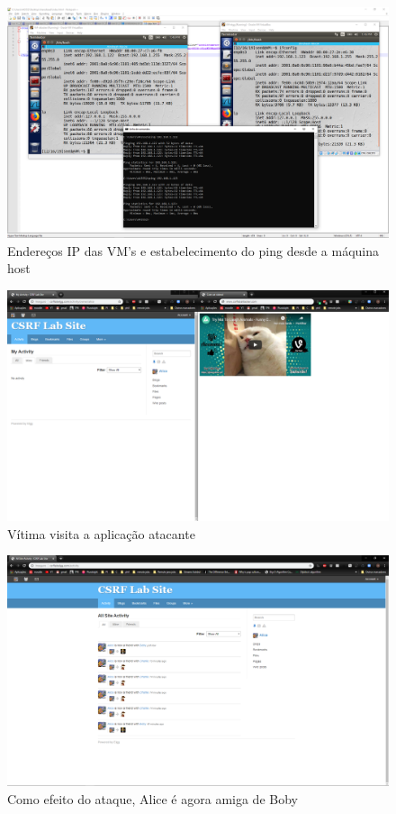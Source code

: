 \documentclass[11pt]{report}
\begin{document}
	
\begin{figure}[!htb]
	\includegraphics[width=\linewidth]{img/ping}
	\caption{Endereços IP das VM's e estabelecimento do ping desde a máquina host}
	\label{fig:ping}
\end{figure}
\begin{figure}[!htb]
	\includegraphics[width=\linewidth]{img/access}
	\caption{Vítima visita a aplicação atacante}
	\label{fig:access}
\end{figure}
\begin{figure}[!htb]
	\includegraphics[width=\linewidth]{img/done}
	\caption{Como efeito do ataque, Alice é agora amiga de Boby}
	\label{fig:done}
\end{figure}
\end{document}
